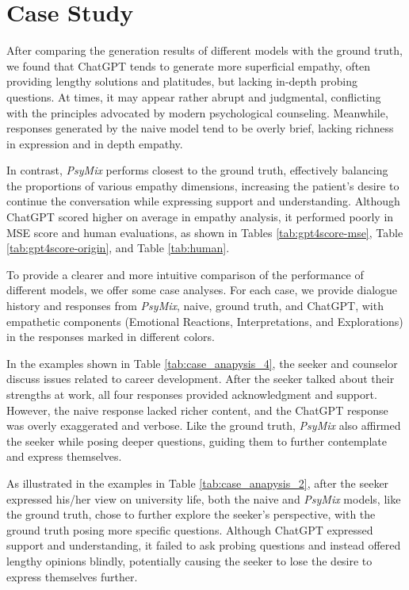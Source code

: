 \section{Case Study}
\label{apd:case}
After comparing the generation results of different models with the ground truth, we found that ChatGPT tends to generate more superficial empathy, often providing lengthy solutions and platitudes, but lacking in-depth probing questions. At times, it may appear rather abrupt and judgmental, conflicting with the principles advocated by modern psychological counseling. Meanwhile, responses generated by the naive model tend to be overly brief, lacking richness in expression and in depth empathy.

In contrast, \textit{PsyMix} performs closest to the ground truth, effectively balancing the proportions of various empathy dimensions, increasing the patient's desire to continue the conversation while expressing support and understanding. Although ChatGPT scored higher on average in empathy analysis, it performed poorly in MSE score and human evaluations, as shown in Tables \ref{tab:gpt4score-mse}, Table \ref{tab:gpt4score-origin}, and Table \ref{tab:human}. 

To provide a clearer and more intuitive comparison of the performance of different models, we offer some case analyses. For each case, we provide dialogue history and responses from \textit{PsyMix}, naive, ground truth, and ChatGPT, with empathetic components (\textcolor{orange!50!brown}{Emotional Reactions}, \textcolor{blue!50!black}{Interpretations}, and \textcolor{green!50!black}{Explorations}) in the responses marked in different colors.

In the examples shown in Table \ref{tab:case_anapysis_4}, the seeker and counselor discuss issues related to career development. After the seeker talked about their strengths at work, all four responses provided acknowledgment and support. However, the naive response lacked richer content, and the ChatGPT response was overly exaggerated and verbose. Like the ground truth, \textit{PsyMix} also affirmed the seeker while posing deeper questions, guiding them to further contemplate and express themselves.


As illustrated in the examples in Table \ref{tab:case_anapysis_2}, after the seeker expressed his/her view on university life, both the naive and \textit{PsyMix} models, like the ground truth, chose to further explore the seeker's perspective, with the ground truth posing more specific questions. Although ChatGPT expressed support and understanding, it failed to ask probing questions and instead offered lengthy opinions blindly, potentially causing the seeker to lose the desire to express themselves further.

